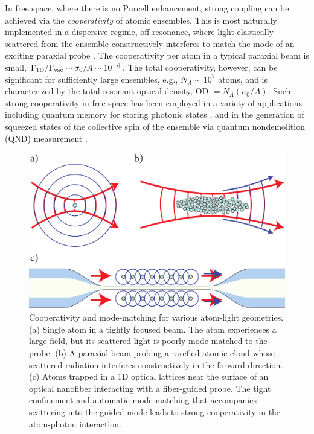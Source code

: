 \documentclass[preprint, aps,pra,onecolumn]{revtex4-1} %
\newcommand{\oneD}{{\rm 1D}}
\newcommand{\vac}{{\rm vac}}
\begin{document}
In free space, where there is no Purcell enhancement, strong coupling can be achieved via the {\em cooperativity} of atomic ensembles.  
This is most naturally implemented in a dispersive regime, off resonance, where light elastically scattered from the ensemble constructively interferes to match the mode of an exciting paraxial probe \cite{baragiola_three-dimensional_2014}.  The cooperativity per atom in a typical paraxial beam is small, $\Gamma_{\oneD}/\Gamma_{\vac} \sim \sigma_0/A  \sim 10^{-6}$.  
The total cooperativity, however, can be significant for sufficiently large ensembles, e.g., $N_A \sim  10^7$ atoms, and is characterized by the total {\color{blue} resonant} optical density, OD $= N_A (\sigma_0/A)$.  
Such strong cooperativity in free space has been employed in a variety of applications including quantum memory for storing photonic states \cite{chaneliere_storage_2005}, and in the generation of squeezed states of the collective spin of the ensemble via quantum nondemolition (QND) measurement \cite{kuzmich_generation_2000, appel_mesoscopic_2009, takano_spin_2009, sewell_magnetic_2012}.   

\begin{figure}
\includegraphics[scale=0.80]{./Figs/Fig_ModeMatch}
\caption{Cooperativity and mode-matching for various atom-light geometries. (a) Single atom in a tightly focused beam. The atom experiences a large field, but its scattered light is poorly mode-matched to the probe. (b) A paraxial beam probing a rarefied atomic cloud whose scattered radiation interferes constructively in the forward direction. (c) Atoms trapped in a 1D optical lattices  near the surface of an optical nanofiber interacting with a fiber-guided probe. The tight confinement and automatic mode matching {\color{blue} that accompanies} scattering into the guided mode leads to strong cooperativity in the atom-photon interaction.}\label{Fig::ModeMatching}
\end{figure}
\end{document}
